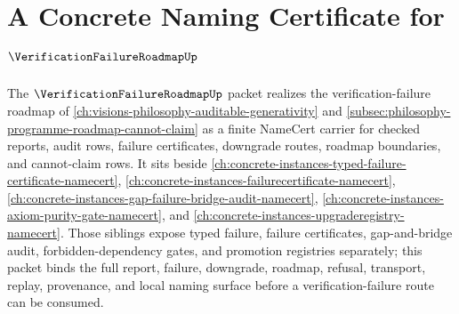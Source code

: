 \chapter{A Concrete Naming Certificate for $\VerificationFailureRoadmapUp$}
\label{ch:concrete-instances-verification-failure-roadmap-namecert}

The $\VerificationFailureRoadmapUp$ packet realizes the verification-failure roadmap of \autoref{ch:visions-philosophy-auditable-generativity} and \autoref{subsec:philosophy-programme-roadmap-cannot-claim} as a finite NameCert carrier for checked reports, audit rows, failure certificates, downgrade routes, roadmap boundaries, and cannot-claim rows. It sits beside \autoref{ch:concrete-instances-typed-failure-certificate-namecert}, \autoref{ch:concrete-instances-failurecertificate-namecert}, \autoref{ch:concrete-instances-gap-failure-bridge-audit-namecert}, \autoref{ch:concrete-instances-axiom-purity-gate-namecert}, and \autoref{ch:concrete-instances-upgraderegistry-namecert}. Those siblings expose typed failure, failure certificates, gap-and-bridge audit, forbidden-dependency gates, and promotion registries separately; this packet binds the full report, failure, downgrade, roadmap, refusal, transport, replay, provenance, and local naming surface before a verification-failure route can be consumed.


